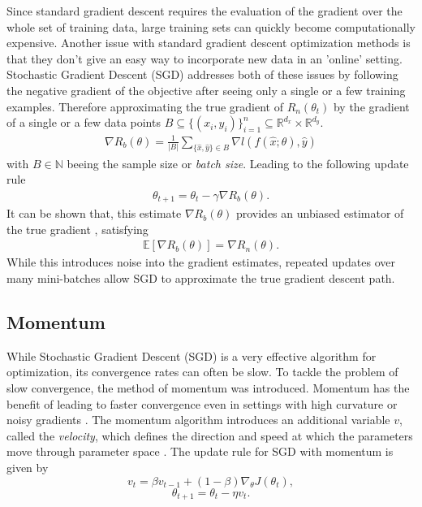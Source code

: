 Since standard gradient descent requires the evaluation of the gradient over the whole set of training data, large training sets can quickly become 
computationally expensive.
Another issue with standard gradient descent optimization methods is that they don’t give an easy way to incorporate new data in an 'online' setting.
 Stochastic Gradient Descent (SGD) addresses both of these issues by following the negative gradient of the objective after seeing only a single or a few training examples.
 Therefore approximating the true gradient of $ R_n(\theta_t)$ by the gradient of a single or a few data points  \(B \subseteq  \{ (x_i, y_i) \}_{i=1}^{n} \subseteq \mathbb{R}^{d_x} \times \mathbb{R}^{d_y}\).
\begin{align}
    \nabla R_b(\theta) = \frac{1}{|B|} \sum_{\{\hat{x}, \hat{y}\} \in B} \nabla l(f(\hat{x}; \theta), \hat{y})
\end{align}
    with $B \in \mathbb{N}$ beeing the sample size or \emph{batch size}.
 Leading to the following update rule \cite{stanfordSGD}
 \begin{align}
    \theta_{t+1} = \theta_t - \gamma  {\nabla} R_b(\theta).
\end{align}
It can be shown that, this estimate $\nabla R_b(\theta)$ provides an unbiased estimator of the true gradient \cite{garrigos2024handbook}, satisfying
\begin{align}
\mathbb{E}[{\nabla} R_b(\theta)] = \nabla R_n(\theta) .
\end{align}
While this introduces noise into the gradient estimates, repeated updates over many mini-batches allow SGD to approximate the true gradient descent path.
\subsection{Momentum \cite{Goodfellow-et-al-2016}}
\label{sec:momentum}


While Stochastic Gradient Descent (SGD) is a very effective algorithm for optimization,
its convergence rates can often be slow. To tackle the problem of slow convergence,
the method of momentum \cite{polyak1964some} was introduced. Momentum has the benefit of
leading to faster convergence even in settings with high curvature or noisy gradients \cite{Goodfellow-et-al-2016}.
The momentum algorithm introduces an additional variable $v$, called the \emph{velocity},
which defines the direction and speed at which the parameters move through parameter space \cite{Goodfellow-et-al-2016}.
The update rule for SGD with momentum is given by
\[    v_t = \beta v_{t-1} + (1 - \beta) \nabla_{\theta} J(\theta_t), \]
\[     \theta_{t+1} = \theta_t - \eta v_t .\]

